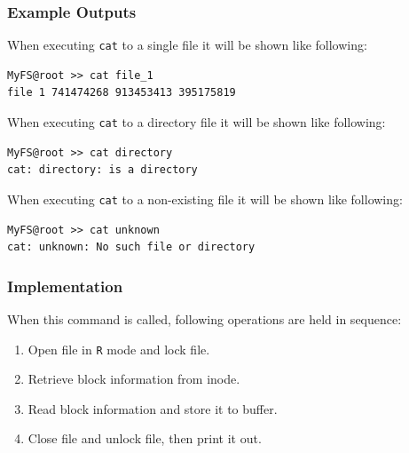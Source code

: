 \documentclass{homework}
\begin{document}
\subsubsection{Example Outputs}
When executing \texttt{cat} to a single file it will be shown like following:
\\
\begin{center}
\begin{code}
\begin{verbatim}
MyFS@root >> cat file_1
file 1 741474268 913453413 395175819
\end{verbatim}
\end{code}
\end{center}
When executing \texttt{cat} to a directory file it will be shown like following:
\\
\begin{center}
\begin{code}
\begin{verbatim}
MyFS@root >> cat directory
cat: directory: is a directory
\end{verbatim}
\end{code}
\end{center}
When executing \texttt{cat} to a non-existing file it will be shown like following:
\\
\begin{center}
\begin{code}
\begin{verbatim}
MyFS@root >> cat unknown
cat: unknown: No such file or directory
\end{verbatim}
\end{code}
\end{center}

\subsubsection{Implementation}
When this command is called, following operations are held in sequence:
\begin{enumerate}
    \item Open file in \texttt{R} mode and lock file.
    \item Retrieve block information from inode.
    \item Read block information and store it to buffer.
    \item Close file and unlock file, then print it out.
\end{enumerate}
\end{document}
